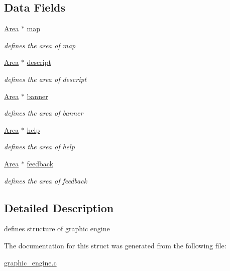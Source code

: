 \subsection*{Data Fields}
\begin{DoxyCompactItemize}
\item 
\mbox{\label{struct__Graphic__engine_a1ea06bb881d335da8c31d63b3e834bdb}} 
\hyperlink{screen_8h_acfdfc42f6522d75fa3c16713afde8127}{Area} $\ast$ \hyperlink{struct__Graphic__engine_a1ea06bb881d335da8c31d63b3e834bdb}{map}
\begin{DoxyCompactList}\small\item\em defines the area of map \end{DoxyCompactList}\item 
\mbox{\label{struct__Graphic__engine_a414bb888ecce3389c7ce348264758e58}} 
\hyperlink{screen_8h_acfdfc42f6522d75fa3c16713afde8127}{Area} $\ast$ \hyperlink{struct__Graphic__engine_a414bb888ecce3389c7ce348264758e58}{descript}
\begin{DoxyCompactList}\small\item\em defines the area of descript \end{DoxyCompactList}\item 
\mbox{\label{struct__Graphic__engine_a440dfb2c23c3c4b7d3871187371117b9}} 
\hyperlink{screen_8h_acfdfc42f6522d75fa3c16713afde8127}{Area} $\ast$ \hyperlink{struct__Graphic__engine_a440dfb2c23c3c4b7d3871187371117b9}{banner}
\begin{DoxyCompactList}\small\item\em defines the area of banner \end{DoxyCompactList}\item 
\mbox{\label{struct__Graphic__engine_ade1d3e95ad6def427f613a4a2d101875}} 
\hyperlink{screen_8h_acfdfc42f6522d75fa3c16713afde8127}{Area} $\ast$ \hyperlink{struct__Graphic__engine_ade1d3e95ad6def427f613a4a2d101875}{help}
\begin{DoxyCompactList}\small\item\em defines the area of help \end{DoxyCompactList}\item 
\mbox{\label{struct__Graphic__engine_a4fc0ef353d000b20d57fb75d898c6d2d}} 
\hyperlink{screen_8h_acfdfc42f6522d75fa3c16713afde8127}{Area} $\ast$ \hyperlink{struct__Graphic__engine_a4fc0ef353d000b20d57fb75d898c6d2d}{feedback}
\begin{DoxyCompactList}\small\item\em defines the area of feedback \end{DoxyCompactList}\end{DoxyCompactItemize}


\subsection{Detailed Description}
defines structure of graphic engine 

The documentation for this struct was generated from the following file\+:\begin{DoxyCompactItemize}
\item 
\hyperlink{graphic__engine_8c}{graphic\+\_\+engine.\+c}\end{DoxyCompactItemize}
